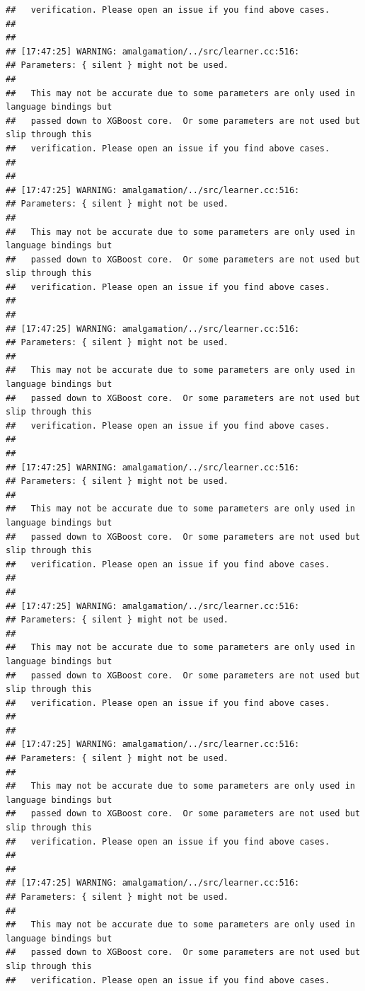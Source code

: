 \documentclass[AMS,STIX2COL]{WileyNJD-v2}\usepackage[]{graphicx}\usepackage[]{color}
\makeatletter
\newenvironment{kframe}{%
 \def\at@end@of@kframe{}%
 \ifinner\ifhmode%
  \def\at@end@of@kframe{\end{minipage}}%
  \begin{minipage}{\columnwidth}%
 \fi\fi%
 \def\FrameCommand##1{\hskip\@totalleftmargin \hskip-\fboxsep
 \colorbox{shadecolor}{##1}\hskip-\fboxsep
     \hskip-\linewidth \hskip-\@totalleftmargin \hskip\columnwidth}%
 \MakeFramed {\advance\hsize-\width
   \@totalleftmargin\z@ \linewidth\hsize
   \@setminipage}}%
 {\par\unskip\endMakeFramed%
 \at@end@of@kframe}
\newenvironment{knitrout}{}{} %
\makeatother
\begin{document}
\begin{knitrout}
\begin{kframe}
\begin{verbatim}
##   verification. Please open an issue if you find above cases.
## 
## 
## [17:47:25] WARNING: amalgamation/../src/learner.cc:516: 
## Parameters: { silent } might not be used.
## 
##   This may not be accurate due to some parameters are only used in language bindings but
##   passed down to XGBoost core.  Or some parameters are not used but slip through this
##   verification. Please open an issue if you find above cases.
## 
## 
## [17:47:25] WARNING: amalgamation/../src/learner.cc:516: 
## Parameters: { silent } might not be used.
## 
##   This may not be accurate due to some parameters are only used in language bindings but
##   passed down to XGBoost core.  Or some parameters are not used but slip through this
##   verification. Please open an issue if you find above cases.
## 
## 
## [17:47:25] WARNING: amalgamation/../src/learner.cc:516: 
## Parameters: { silent } might not be used.
## 
##   This may not be accurate due to some parameters are only used in language bindings but
##   passed down to XGBoost core.  Or some parameters are not used but slip through this
##   verification. Please open an issue if you find above cases.
## 
## 
## [17:47:25] WARNING: amalgamation/../src/learner.cc:516: 
## Parameters: { silent } might not be used.
## 
##   This may not be accurate due to some parameters are only used in language bindings but
##   passed down to XGBoost core.  Or some parameters are not used but slip through this
##   verification. Please open an issue if you find above cases.
## 
## 
## [17:47:25] WARNING: amalgamation/../src/learner.cc:516: 
## Parameters: { silent } might not be used.
## 
##   This may not be accurate due to some parameters are only used in language bindings but
##   passed down to XGBoost core.  Or some parameters are not used but slip through this
##   verification. Please open an issue if you find above cases.
## 
## 
## [17:47:25] WARNING: amalgamation/../src/learner.cc:516: 
## Parameters: { silent } might not be used.
## 
##   This may not be accurate due to some parameters are only used in language bindings but
##   passed down to XGBoost core.  Or some parameters are not used but slip through this
##   verification. Please open an issue if you find above cases.
## 
## 
## [17:47:25] WARNING: amalgamation/../src/learner.cc:516: 
## Parameters: { silent } might not be used.
## 
##   This may not be accurate due to some parameters are only used in language bindings but
##   passed down to XGBoost core.  Or some parameters are not used but slip through this
##   verification. Please open an issue if you find above cases.

\end{verbatim}
\end{kframe}
\end{knitrout}
\end{document}
